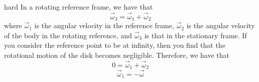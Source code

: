 \newpage
\begin{solution}{hard}
In a rotating reference frame, we have that 
\[\vec\omega_3 = \vec\omega_1 + \vec\omega_2\]
where $\vec\omega_1$ is the angular velocity in the reference frame, $\vec\omega_2$ is the angular velocity of the body in the rotating reference, and $\vec\omega_3$ is that in the stationary frame. If you consider the reference point to be at infinity, then you find that the rotational motion of the disk becomes negligible. Therefore, we have that 
\[0 = \vec\omega_1 + \vec\omega_2\]
\[\boxed{\vec\omega_1 = -\vec\omega}\]
\end{solution}
